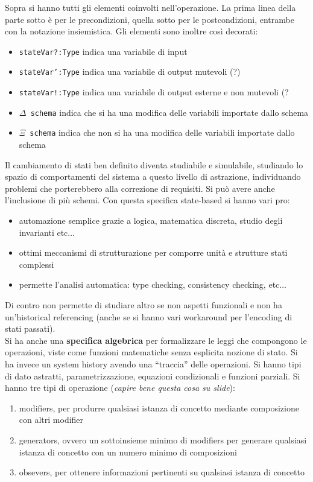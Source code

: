 \documentclass[a4paper,12pt, oneside]{book}
\begin{document}
Sopra si hanno tutti gli elementi coinvolti nell'operazione. La prima linea
della parte sotto è per le precondizioni, quella sotto per le postcondizioni,
entrambe con la notazione insiemistica. Gli elementi sono inoltre
così decorati: 
\begin{itemize}
  \item \texttt{stateVar?:Type} indica una variabile di input
  \item \texttt{stateVar':Type} indica una variabile di output mutevoli (?)
  \item \texttt{stateVar!:Type} indica una variabile di output esterne e non
  mutevoli (?
  \item \texttt{$\Delta$ schema} indica che si ha una modifica delle variabili
  importate dallo schema
  \item \texttt{$\Xi$ schema} indica che non si ha una modifica delle variabili
  importate dallo schema
\end{itemize}
Il cambiamento di stati ben definito diventa studiabile e simulabile, studiando
lo spazio di comportamenti del sistema a questo livello di astrazione,
individuando problemi che porterebbero alla correzione di requisiti.
Si può avere anche l'inclusione di più schemi. Con questa specifica state-based
si hanno vari pro:
\begin{itemize}
  \item automazione semplice grazie a logica, matematica discreta, studio degli
  invarianti etc$\ldots$
  \item ottimi meccanismi di strutturazione per comporre unità e strutture stati
  complessi
  \item permette l'analisi automatica: type checking, consistency
  checking, etc$\ldots$
\end{itemize}
Di contro non permette di studiare altro se non aspetti funzionali e non ha
un'historical referencing (anche se si hanno vari workaround per l'encoding di
stati passati).\\
Si ha anche una \textbf{specifica algebrica} per formalizzare le leggi che
compongono le operazioni, viste come funzioni matematiche senza esplicita
nozione di stato. Si ha invece un system history avendo una ``traccia'' delle
operazioni. Si hanno tipi di dato astratti, parametrizzazione, equazioni
condizionali e funzioni parziali. Si hanno tre tipi di operazione
(\textit{capire bene questa cosa su slide}):
\begin{enumerate}
  \item modifiers, per produrre qualsiasi istanza di concetto mediante
  composizione con altri modifier 
  \item generators, ovvero un sottoinsieme minimo di modifiers per generare
  qualsiasi istanza di concetto con un numero minimo di composizioni 
  \item obsevers, per ottenere informazioni pertinenti su qualsiasi istanza di
  concetto
\end{enumerate}
\end{document}
